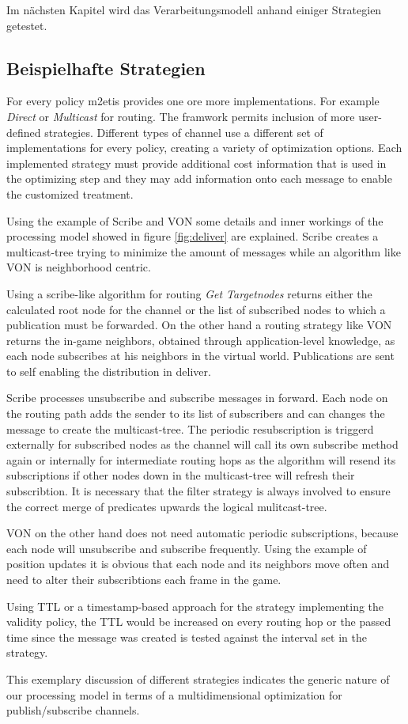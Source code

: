 Im nächsten Kapitel wird das Verarbeitungsmodell anhand einiger Strategien getestet.

\subsection{Beispielhafte Strategien}
For every policy \ac{m2etis} provides one ore more implementations. For example \emph{Direct} or \emph{Multicast} for routing. The framwork permits inclusion of more user-defined strategies. Different types of channel use a different set of implementations for every policy, creating a variety of optimization options. Each implemented strategy must provide additional cost information that is used in the optimizing step and they may add information onto each message to enable the customized treatment.

Using the example of Scribe \cite{Castro2002Scribe} and VON \cite{Hu2006VON} some details and inner workings of the processing model showed in figure \ref{fig:deliver} are explained. Scribe creates a multicast-tree trying to minimize the amount of messages while an algorithm like VON is neighborhood centric.

Using a scribe-like algorithm for routing \emph{Get Targetnodes} returns either the calculated root node for the channel or the list of subscribed nodes to which a publication must be forwarded. On the other hand a routing strategy like VON returns the in-game neighbors, obtained through application-level knowledge, as each node subscribes at his neighbors in the virtual world. Publications are sent to self enabling the distribution in deliver.

Scribe processes unsubscribe and subscribe messages in forward. Each node on the routing path adds the sender to its list of subscribers and can changes the message to create the multicast-tree. The periodic resubscription is triggerd externally for subscribed nodes as the channel will call its own subscribe method again or internally for intermediate routing hops as the algorithm will resend its subscriptions if other nodes down in the multicast-tree will refresh their subscribtion. It is necessary that the filter strategy is always involved to ensure the correct merge of predicates upwards the logical mulitcast-tree.

VON on the other hand does not need automatic periodic subscriptions, because each node will unsubscribe and subscribe frequently. Using the example of position updates it is obvious that each node and its neighbors move often and need to alter their subscribtions each frame in the game.

Using TTL or a timestamp-based approach for the strategy implementing the validity policy, the TTL would be increased on every routing hop or the passed time since the message was created is tested against the interval set in the strategy.

This exemplary discussion of different strategies indicates the generic nature of our processing model in terms of a multidimensional optimization for publish/subscribe channels.
